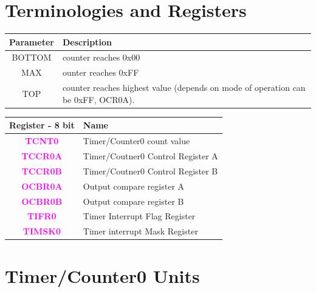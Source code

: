 \documentclass{article}
\newcommand{\regFormat}[1]{\textbf{\textcolor{magenta}{#1}}}
\begin{document}
\section{Terminologies and Registers}
\begin{minipage}{0.45\textwidth}
    \begin{tabular}{c|p{5.5cm}}
        \textbf{Parameter} & \textbf{Description}\\
        \hline
        BOTTOM & counter reaches 0x00\\
        MAX & ounter reaches 0xFF\\
        TOP & counter reaches highest value (depends on mode of operation can be 0xFF, OCR0A).        
    \end{tabular}
\end{minipage}
\begin{minipage}{0.5\textwidth}
    \begin{tabular}{c|p{6cm}}
        \textbf{Register - 8 bit} & \textbf{Name}\\
        \hline
        \regFormat{TCNT0} & Timer/Counter0 count value\\
        \regFormat{TCCR0A} & Timer/Coutner0 Control Register A\\
        \regFormat{TCCR0B} & Timer/Coutner0 Control Register B\\
        \regFormat{OCBR0A} & Output compare register A\\
        \regFormat{OCBR0B} & Output compare register B\\
        \regFormat{TIFR0} & Timer Interrupt Flag Register\\
        \regFormat{TIMSK0} & Timer interrupt Mask Register\\
    \end{tabular}
\end{minipage}

\section{Timer/Counter0 Units}
\end{document}
